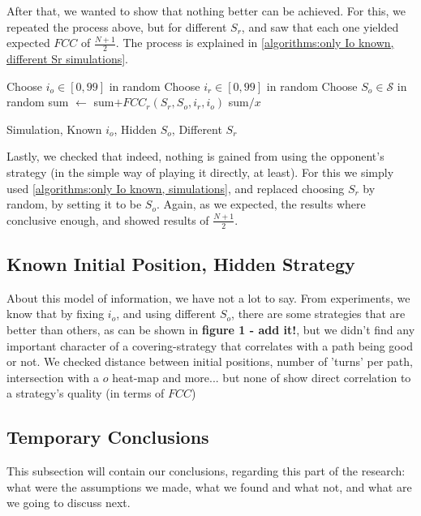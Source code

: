\documentclass[a4paper,10pt]{article}
\newcommand\rob{\ensuremath{r}\xspace}
\newcommand\opp{\ensuremath{o}\xspace}
\newcommand{\fcc}{\ensuremath{FCC}\xspace}
\begin{document}
After that, we wanted to show that nothing better can be achieved. For this, we repeated the process above, but for different $S_{\rob}$, and saw that each one yielded expected \fcc of $\frac{N+1}{2}$. The process is explained in \ref{algorithms:only Io known, different Sr simulations}.
\begin{algorithm}
\begin{algorithmic}
	\FOR {$S_{\rob} \in \mathcal{S}$}
    	\STATE Choose $i_{\opp} \in \left[0,99\right]$ in random
          \STATE Choose $i_{\rob} \in \left[0,99\right]$ in random
          \STATE Choose $S_{\opp} \in \mathcal{S}$ in random
          \STATE sum $\leftarrow $ sum$+ {\fcc}_{\rob}(S_{\rob},S_{\opp}, i_{\rob}, i_{\opp})$
      \ENDFOR
    \RETURN sum$/x$
    \ENDFOR
    
  
\end{algorithmic}
\caption{Simulation, Known $i_{\opp}$, Hidden $S_{\opp}$, Different $S_r$\label{algorithms:only Io known, different Sr simulations}}
\end{algorithm}

Lastly, we checked that indeed, nothing is gained from using the opponent's strategy (in the simple way of playing it directly, at least). For this we simply used \ref{algorithms:only Io known, simulations}, and replaced choosing $S_{\rob}$ by random, by setting it to be $S_{\opp}$. Again, as we expected, the results where conclusive enough, and showed results of $\frac{N+1}{2}$.


\subsection{Known Initial Position, Hidden Strategy}
About this model of information, we have not a lot to say. From experiments, we know that by fixing $i_{\opp}$, and using different $S_{\opp}$, there are some strategies that are better than others, as can be shown in \textbf{figure 1 - add it!}, but we didn't find any important character of a covering-strategy that correlates with a path being good or not. We checked distance between initial positions, number of 'turns' per path, intersection with a \opp heat-map and more... but none of show direct correlation to a strategy's quality (in terms of \fcc)

\subsection{Temporary Conclusions}
This subsection will contain our conclusions, regarding this part of the research: what were the assumptions we made, what we found and what not, and what are we going to discuss next.
\end{document}
